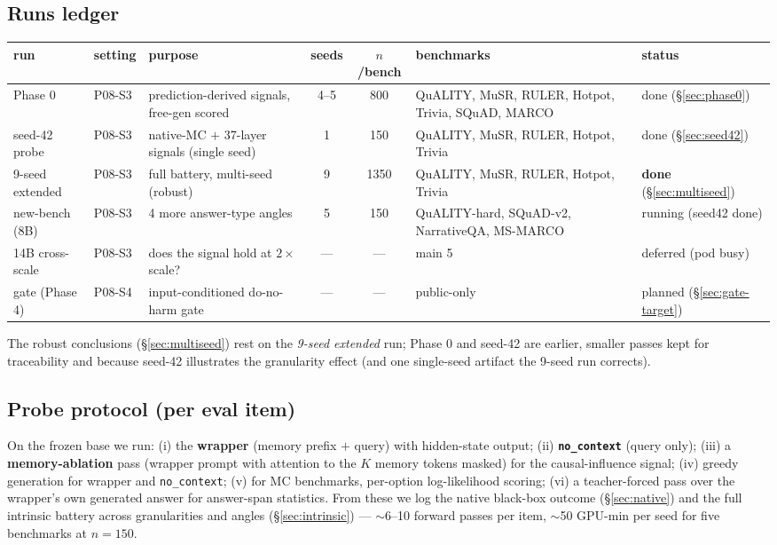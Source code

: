 \documentclass[11pt]{article}
\newcommand{\noctx}{\texttt{no\_context}}
\begin{document}
\subsection{Runs ledger}
\begin{center}\footnotesize
\setlength{\tabcolsep}{4pt}
\begin{tabular}{l l l c c p{3.0cm} l}
\toprule
run & setting & purpose & seeds & $n$/bench & benchmarks & status\\
\midrule
Phase 0 & P08-S3 & prediction-derived signals, free-gen scored & 4--5 & 800 & QuALITY, MuSR, RULER, Hotpot, Trivia, SQuAD, MARCO & done (\S\ref{sec:phase0})\\
seed-42 probe & P08-S3 & native-MC $+$ 37-layer signals (single seed) & 1 & 150 & QuALITY, MuSR, RULER, Hotpot, Trivia & done (\S\ref{sec:seed42})\\
9-seed extended & P08-S3 & full battery, multi-seed (robust) & 9 & 1350 & QuALITY, MuSR, RULER, Hotpot, Trivia & \textbf{done} (\S\ref{sec:multiseed})\\
new-bench (8B) & P08-S3 & 4 more answer-type angles & 5 & 150 & QuALITY-hard, SQuAD-v2, NarrativeQA, MS-MARCO & running (seed42 done) \\
14B cross-scale & P08-S3 & does the signal hold at $2{\times}$ scale? & --- & --- & main 5 & deferred (pod busy)\\
gate (Phase 4) & P08-S4 & input-conditioned do-no-harm gate & --- & --- & public-only & planned (\S\ref{sec:gate-target})\\
\bottomrule
\end{tabular}
\end{center}
The robust conclusions (\S\ref{sec:multiseed}) rest on the
\emph{9-seed extended} run; Phase 0 and seed-42 are earlier, smaller
passes kept for traceability and because seed-42 illustrates the
granularity effect (and one single-seed artifact the 9-seed run
corrects).

\subsection{Probe protocol (per eval item)}
On the frozen base we run: (i) the \textbf{wrapper} (memory prefix $+$
query) with hidden-state output; (ii) \textbf{\noctx{}} (query only);
(iii) a \textbf{memory-ablation} pass (wrapper prompt with attention to
the $K$ memory tokens masked) for the causal-influence signal; (iv)
greedy generation for wrapper and \noctx{}; (v) for MC benchmarks,
per-option log-likelihood scoring; (vi) a teacher-forced pass over the
wrapper's own generated answer for answer-span statistics. From these we
log the native black-box outcome (\S\ref{sec:native}) and the full
intrinsic battery across granularities and angles
(\S\ref{sec:intrinsic}) --- $\sim$6--10 forward passes per item,
$\sim$50 GPU-min per seed for five benchmarks at $n{=}150$.
\end{document}
